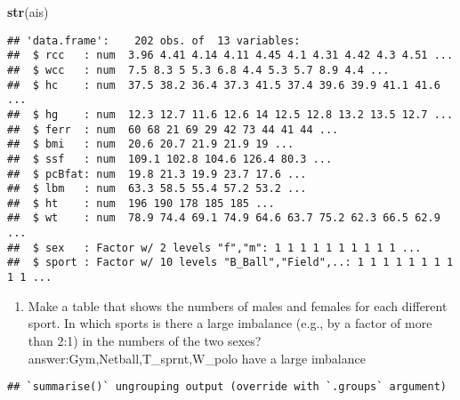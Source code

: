 \documentclass[
]{article}
\newenvironment{Shaded}{\begin{snugshade}}{\end{snugshade}}
\newcommand{\DataTypeTok}[1]{\textcolor[rgb]{0.13,0.29,0.53}{#1}}
\newcommand{\KeywordTok}[1]{\textcolor[rgb]{0.13,0.29,0.53}{\textbf{#1}}}
\newcommand{\NormalTok}[1]{#1}
\newcommand{\OperatorTok}[1]{\textcolor[rgb]{0.81,0.36,0.00}{\textbf{#1}}}
\newcommand{\StringTok}[1]{\textcolor[rgb]{0.31,0.60,0.02}{#1}}
\providecommand{\tightlist}{%
  \setlength{\itemsep}{0pt}\setlength{\parskip}{0pt}}
\begin{document}
\begin{Shaded}
\begin{Highlighting}[]
\KeywordTok{str}\NormalTok{(ais)}
\end{Highlighting}
\end{Shaded}

\begin{verbatim}
## 'data.frame':    202 obs. of  13 variables:
##  $ rcc   : num  3.96 4.41 4.14 4.11 4.45 4.1 4.31 4.42 4.3 4.51 ...
##  $ wcc   : num  7.5 8.3 5 5.3 6.8 4.4 5.3 5.7 8.9 4.4 ...
##  $ hc    : num  37.5 38.2 36.4 37.3 41.5 37.4 39.6 39.9 41.1 41.6 ...
##  $ hg    : num  12.3 12.7 11.6 12.6 14 12.5 12.8 13.2 13.5 12.7 ...
##  $ ferr  : num  60 68 21 69 29 42 73 44 41 44 ...
##  $ bmi   : num  20.6 20.7 21.9 21.9 19 ...
##  $ ssf   : num  109.1 102.8 104.6 126.4 80.3 ...
##  $ pcBfat: num  19.8 21.3 19.9 23.7 17.6 ...
##  $ lbm   : num  63.3 58.5 55.4 57.2 53.2 ...
##  $ ht    : num  196 190 178 185 185 ...
##  $ wt    : num  78.9 74.4 69.1 74.9 64.6 63.7 75.2 62.3 66.5 62.9 ...
##  $ sex   : Factor w/ 2 levels "f","m": 1 1 1 1 1 1 1 1 1 1 ...
##  $ sport : Factor w/ 10 levels "B_Ball","Field",..: 1 1 1 1 1 1 1 1 1 1 ...
\end{verbatim}

\begin{enumerate}
\def\labelenumi{(\alph{enumi})}
\setcounter{enumi}{1}
\tightlist
\item
  Make a table that shows the numbers of males and females for each
  different sport. In which sports is there a large imbalance (e.g., by
  a factor of more than 2:1) in the numbers of the two sexes?
  answer:Gym,Netball,T\_sprnt,W\_polo have a large imbalance
\end{enumerate}

\begin{Shaded}
\end{Shaded}

\begin{verbatim}
## `summarise()` ungrouping output (override with `.groups` argument)
\end{verbatim}
\end{document}
